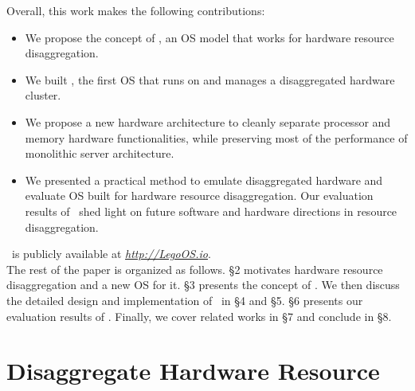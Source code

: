 \documentclass[10pt,times,twocolumn]{z2-article}
\begin{document}
Overall, this work makes the following contributions:

\begin{itemize}

\item We propose the concept of \splitkernel, an OS model that works for hardware resource disaggregation.

\item We built \lego, the first OS that runs on and manages a disaggregated hardware cluster.

\item We propose a new hardware architecture to cleanly separate processor and memory hardware functionalities, 
while preserving most of the performance of monolithic server architecture.

\item We presented a practical method to emulate disaggregated hardware and evaluate OS built for hardware resource disaggregation.
Our evaluation results of \lego\ shed light on future software and hardware directions in resource disaggregation.


\end{itemize}

\lego\ is publicly available at {\small {\em {\url{http://LegoOS.io}}}}.\\

The rest of the paper is organized as follows.
\S{}2 motivates hardware resource disaggregation and a new OS for it.
\S{}3 presents the concept of \splitkernel.
We then discuss the detailed design and implementation of \lego\ in \S{}4 and \S{}5.
\S{}6 presents our evaluation results of \lego.
Finally, we cover related works in \S{}7 and conclude in \S{}8.

\section{Disaggregate Hardware Resource}
\label{sec:motivation}
\end{document}
